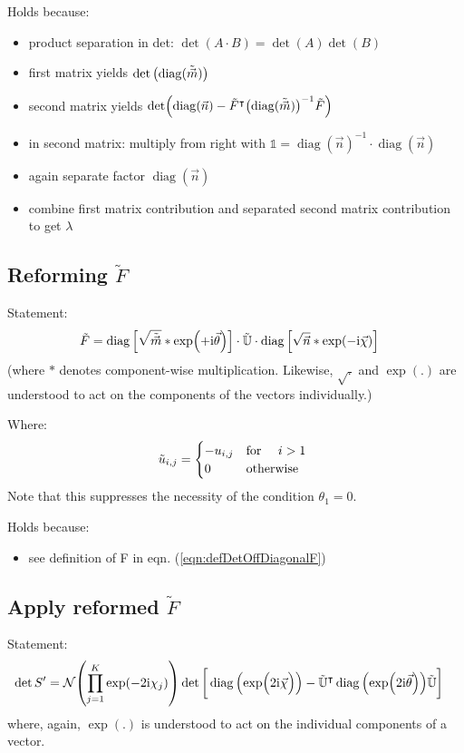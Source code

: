 \documentclass[
	english,
	a4paper,
	fontsize=10pt,
	parskip=half,
	titlepage=true,
	DIV=12,
	final
]{scrreprt}
\newcommand*{\transp}{\ensuremath{^\intercal}}
\newcommand*{\iunit}{\ensuremath{\mathrm{i}}}
\DeclareMathOperator{\diag}{diag}
\begin{document}
Holds because:
\begin{itemize}
\item product separation in det: $\det(A \cdot B) = \det(A) \det(B)$
\item first matrix yields $\det\qty( \diag(\tilde{\vec{m}}) )$
\item second matrix yields $\det( \diag(\vec{n}) - \tilde{F}\transp \qty(\diag(\tilde{\vec{m}}))^{-1}\tilde{F} )$
\item in second matrix: multiply from right with $\mathds{1} = \diag(\vec{n})^{-1} \cdot \diag(\vec{n})$
\item again separate factor $\diag(\vec{n})$
\item combine first matrix contribution and separated second matrix contribution to get $\lambda$
\end{itemize}

\subsection{Reforming $\tilde{F}$}
Statement:
\begin{align}
	\tilde{F}
&=
	\diag\qty[ \sqrt{ \tilde{\vec{m}}} * \exp(+\iunit \vec{\theta}) ]
	\cdot \tilde{\mathbb{U}} \cdot
	\diag\qty[ \sqrt{        \vec{n} } * \exp(-\iunit \vec{\chi  }) ]
\end{align}
(where $*$ denotes component-wise multiplication. Likewise, $\sqrt{.}$ and $\exp(.)$ are understood to act on the components of the vectors individually.)

Where:
\begin{equation}
	\tilde{u}_{i,j} = \begin{cases}
		-u_{i,j}		&\qq*{for } i > 1 \\
		0			&\qotherwise*
	\end{cases}
\end{equation}
Note that this suppresses the necessity of the condition $\theta_1 = 0$.

Holds because:
\begin{itemize}
\item see definition of F in eqn. (\ref{eqn:defDetOffDiagonalF})
\end{itemize}

\subsection{Apply reformed $\tilde{F}$}
Statement:
\begin{align}
	\det S'
&=
	\mathcal{N}
	\qty( \prod_{j=1}^{K} \exp(-2\iunit \chi_j) )
	\det\qty[\bigg.
		\diag\qty(\exp(\Big.2\iunit\vec{\chi}))
		-
		\tilde{\mathbb{U}}\transp
		\diag\qty(\exp(2\iunit\vec{\theta}))
		\tilde{\mathbb{U}}
	]
\end{align}
where, again, $\exp(.)$ is understood to act on the individual components of a vector.
\end{document}
